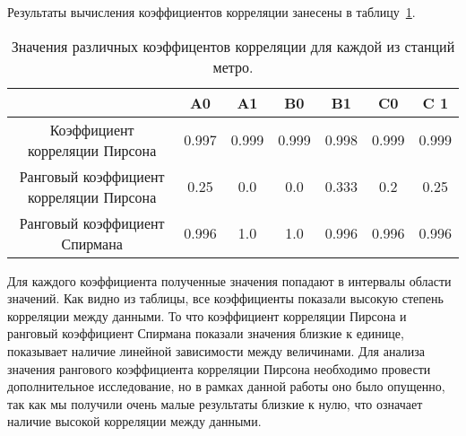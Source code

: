 \documentclass[12pt,a4paper,oneside]{extarticle}
\begin{document}
    Результаты вычисления коэффициентов корреляции занесены в таблицу~\ref{tabular:syntax}.
    \begin{table}[ht!]
        \caption{Значения различных коэффицентов корреляции для каждой из станций метро.}
        \centering
        \label{tabular:syntax}
        \begin{tabular}{|c|c|c|c|c|c|c|}
            \hline
                                                    & A0    & A1    & B0    & B1    & C0    & C 1 \\ \hline
            Коэффициент корреляции Пирсона          & 0.997 & 0.999 & 0.999 & 0.998 & 0.999 & 0.999 \\ \hline
            Ранговый коэффициент корреляции Пирсона & 0.25  & 0.0   & 0.0   & 0.333 & 0.2   & 0.25 \\ \hline
            Ранговый коэффициент Спирмана           & 0.996 & 1.0   & 1.0   & 0.996 & 0.996 & 0.996 \\ \hline
        \end{tabular}
    \end{table}
    Для каждого коэффициента полученные значения попадают в интервалы области значений. Как видно из таблицы, все коэффициенты показали высокую степень корреляции между данными. То что коэффициент корреляции Пирсона и ранговый коэффициент Спирмана показали значения близкие к единице, показывает наличие линейной зависимости между величинами. Для анализа значения рангового коэффициента корреляции Пирсона необходимо провести дополнительное исследование, но в рамках данной работы оно было опущенно, так как мы получили очень малые результаты близкие к нулю, что означает наличие высокой корреляции между данными.
\end{document}
